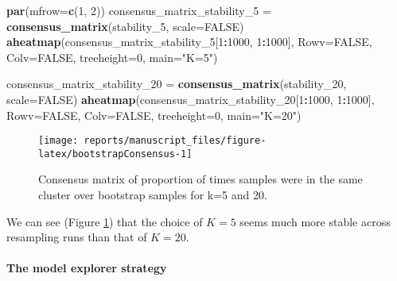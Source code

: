 \documentclass[9pt,a4paper,]{extarticle}
\newenvironment{Shaded}{\begin{snugshade}}{\end{snugshade}}
\newcommand{\DataTypeTok}[1]{\textcolor[rgb]{0.13,0.29,0.53}{#1}}
\newcommand{\DecValTok}[1]{\textcolor[rgb]{0.00,0.00,0.81}{#1}}
\newcommand{\KeywordTok}[1]{\textcolor[rgb]{0.13,0.29,0.53}{\textbf{#1}}}
\newcommand{\NormalTok}[1]{#1}
\newcommand{\OperatorTok}[1]{\textcolor[rgb]{0.81,0.36,0.00}{\textbf{#1}}}
\newcommand{\OtherTok}[1]{\textcolor[rgb]{0.56,0.35,0.01}{#1}}
\newcommand{\StringTok}[1]{\textcolor[rgb]{0.31,0.60,0.02}{#1}}
\begin{document}
\begin{Shaded}
\begin{Highlighting}[]
\KeywordTok{par}\NormalTok{(}\DataTypeTok{mfrow=}\KeywordTok{c}\NormalTok{(}\DecValTok{1}\NormalTok{, }\DecValTok{2}\NormalTok{))}
\NormalTok{consensus_matrix_stability_}\DecValTok{5}\NormalTok{ =}\StringTok{ }\KeywordTok{consensus_matrix}\NormalTok{(stability_}\DecValTok{5}\NormalTok{,}
                        \DataTypeTok{scale=}\OtherTok{FALSE}\NormalTok{)}
\KeywordTok{aheatmap}\NormalTok{(consensus_matrix_stability_}\DecValTok{5}\NormalTok{[}\DecValTok{1}\OperatorTok{:}\DecValTok{1000}\NormalTok{, }\DecValTok{1}\OperatorTok{:}\DecValTok{1000}\NormalTok{], }\DataTypeTok{Rowv=}\OtherTok{FALSE}\NormalTok{,}
     \DataTypeTok{Colv=}\OtherTok{FALSE}\NormalTok{,}
     \DataTypeTok{treeheight=}\DecValTok{0}\NormalTok{, }\DataTypeTok{main=}\StringTok{"K=5"}\NormalTok{)}

\NormalTok{consensus_matrix_stability_}\DecValTok{20}\NormalTok{ =}\StringTok{ }\KeywordTok{consensus_matrix}\NormalTok{(stability_}\DecValTok{20}\NormalTok{,}
                         \DataTypeTok{scale=}\OtherTok{FALSE}\NormalTok{)}
\KeywordTok{aheatmap}\NormalTok{(consensus_matrix_stability_}\DecValTok{20}\NormalTok{[}\DecValTok{1}\OperatorTok{:}\DecValTok{1000}\NormalTok{, }\DecValTok{1}\OperatorTok{:}\DecValTok{1000}\NormalTok{], }\DataTypeTok{Rowv=}\OtherTok{FALSE}\NormalTok{,}
     \DataTypeTok{Colv=}\OtherTok{FALSE}\NormalTok{,}
     \DataTypeTok{treeheight=}\DecValTok{0}\NormalTok{, }\DataTypeTok{main=}\StringTok{"K=20"}\NormalTok{)}
\end{Highlighting}
\end{Shaded}

\begin{figure}[H]

{\centering \texttt{[image: reports/manuscript\_files/figure-latex/bootstrapConsensus-1]} 

}

\caption{Consensus matrix of proportion of times samples were in the same cluster over bootstrap samples for k=5 and 20.}\label{fig:bootstrapConsensus}
\end{figure}

We can see (Figure \ref{fig:bootstrapConsensus}) that the choice of \(K=5\) seems much more stable across resampling runs than that of \(K=20\).

\hypertarget{the-model-explorer-strategy}{%
\paragraph{The model explorer strategy}\label{the-model-explorer-strategy}}
\end{document}

